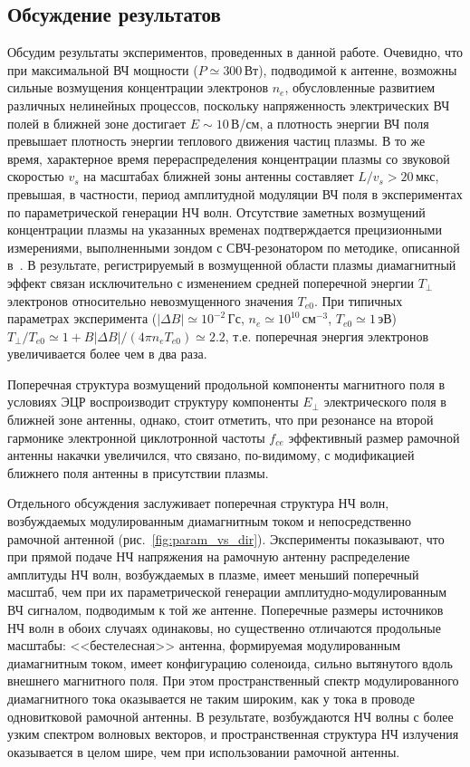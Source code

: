 \documentclass[autoref,10pt]{disser}
\begin{document}
\subsection{Обсуждение результатов}
Обсудим результаты экспериментов, проведенных в данной работе. Очевидно, что при максимальной ВЧ мощности ($P\simeq300$\,Вт), подводимой к антенне, возможны сильные возмущения концентрации электронов $n_e$, обусловленные развитием различных нелинейных процессов, поскольку напряженность электрических ВЧ полей в ближней зоне достигает $E\sim 10$\,В/см, а плотность энергии ВЧ поля превышает плотность энергии теплового движения частиц плазмы. В то же время, характерное время перераспределения концентрации плазмы со звуковой скоростью $v_s$ на масштабах ближней зоны антенны составляет $L/v_s >20$\,мкс, превышая, в частности, период амплитудной модуляции ВЧ поля в экспериментах по параметрической генерации НЧ волн. Отсутствие заметных возмущений концентрации плазмы на указанных временах подтверждается прецизионными измерениями, выполненными зондом с СВЧ-резонатором по методике, описанной в~\cite{Yanin}. В результате, регистрируемый в возмущенной области плазмы диамагнитный эффект связан исключительно с изменением средней поперечной энергии $T_{\perp}$ электронов относительно невозмущенного значения $T_{e0}$. При типичных параметрах эксперимента ($|\Delta B|\simeq 10^{-2}$\,Гс, $n_e\simeq 10^{10}$\,см$^{-3}$, $T_{e0}\simeq 1$\,эВ) $T_{\perp}/T_{e0} \simeq 1 + B|\Delta B|/(4\pi n_{e}T_{e0}) \simeq 2.2$, т.е. поперечная энергия электронов увеличивается более чем в два раза.

Поперечная структура возмущений продольной компоненты магнитного поля в условиях ЭЦР воспроизводит структуру компоненты $E_{\perp}$ электрического поля в ближней зоне антенны, однако, стоит отметить, что при резонансе на второй гармонике электронной циклотронной частоты $f_{ce}$ эффективный размер рамочной антенны накачки увеличился, что связано, по-видимому, с модификацией ближнего поля антенны в присутствии плазмы.

Отдельного обсуждения заслуживает поперечная структура НЧ волн, возбуждаемых модулированным диамагнитным током и непосредственно рамочной антенной (\mbox{рис.~\ref{fig:param_vs_dir}}). Эксперименты показывают, что при прямой подаче НЧ напряжения на рамочную антенну распределение амплитуды НЧ волн, возбуждаемых в плазме, имеет меньший поперечный масштаб, чем при их параметрической генерации амплитудно-модулированным ВЧ сигналом, подводимым к той же антенне. Поперечные размеры источников НЧ волн в обоих случаях одинаковы, но существенно отличаются продольные масштабы: <<бестелесная>> антенна, формируемая модулированным диамагнитным током, имеет конфигурацию соленоида, сильно вытянутого вдоль внешнего магнитного поля. При этом пространственный спектр модулированного диамагнитного тока оказывается не таким широким, как у тока в проводе одновитковой рамочной антенны. В результате, возбуждаются НЧ волны с более узким спектром волновых векторов, и пространственная структура НЧ излучения оказывается в целом шире, чем при использовании рамочной антенны.
\end{document}
